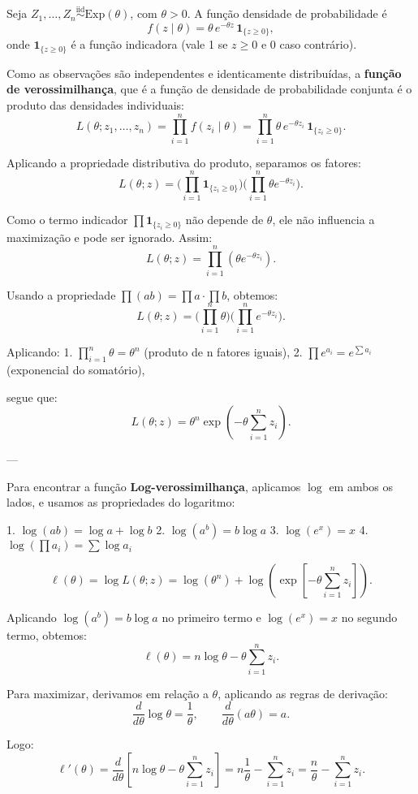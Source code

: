 Seja $Z_1,\ldots,Z_n \stackrel{\text{iid}}{\sim}\mathrm{Exp}(\theta)$, com $\theta>0$.
A função densidade de probabilidade é
\[
f(z\mid\theta)=\theta\,e^{-\theta z}\,\mathbf 1_{\{z\ge 0\}},
\]
onde $\mathbf 1_{\{z\ge 0\}}$ é a função indicadora (vale 1 se $z\ge 0$ e 0 caso contrário).

Como as observações são independentes e identicamente distribuídas,
a \textbf{função de verossimilhança}, que é a função de densidade de probabilidade conjunta é o produto das densidades individuais:
\[
L(\theta;z_1,\ldots,z_n)
=\prod_{i=1}^n f(z_i\mid\theta)
=\prod_{i=1}^n \theta\,e^{-\theta z_i}\,\mathbf 1_{\{z_i\ge 0\}}.
\]

Aplicando a propriedade distributiva do produto, separamos os fatores:
\[
L(\theta;z)
=\Big(\prod_{i=1}^n \mathbf 1_{\{z_i\ge 0\}}\Big)
\Big(\prod_{i=1}^n \theta e^{-\theta z_i}\Big).
\]

Como o termo indicador $\prod \mathbf 1_{\{z_i\ge 0\}}$ não depende de $\theta$,
ele não influencia a maximização e pode ser ignorado. Assim:
\[
L(\theta;z)
=\prod_{i=1}^n (\theta e^{-\theta z_i}).
\]

Usando a propriedade $\prod(ab)=\prod a \cdot \prod b$, obtemos:
\[
L(\theta;z)
=\Big(\prod_{i=1}^n \theta\Big)
\Big(\prod_{i=1}^n e^{-\theta z_i}\Big).
\]

Aplicando:
1. $\prod_{i=1}^n \theta = \theta^n$ (produto de n fatores iguais),  
2. $\prod e^{a_i} = e^{\sum a_i}$ (exponencial do somatório),  

segue que:
\[
L(\theta;z)
=\theta^n \exp\!\left(-\theta \sum_{i=1}^n z_i\right).
\]

---

Para encontrar a função \textbf{Log-verossimilhança}, aplicamos $\log$ em ambos os lados, e usamos as propriedades do logaritmo:

1. $\log(ab)=\log a+\log b$  
2. $\log(a^b)=b\log a$  
3. $\log(e^x)=x$  
4. $\log(\prod a_i)=\sum \log a_i$

\[
\ell(\theta)=\log L(\theta;z)
=\log(\theta^n)+\log\!\left(\exp\!\left[-\theta\sum_{i=1}^n z_i\right]\right).
\]

Aplicando $\log(a^b)=b\log a$ no primeiro termo
e $\log(e^x)=x$ no segundo termo, obtemos:
\[
\ell(\theta)=n\log\theta-\theta\sum_{i=1}^n z_i.
\]

Para maximizar, derivamos em relação a $\theta$, aplicando as regras de derivação:
\[
\frac{d}{d\theta}\log\theta=\frac{1}{\theta}, \qquad
\frac{d}{d\theta}(a\theta)=a.
\]

Logo:
\[
\ell'(\theta)
=\frac{d}{d\theta}[n\log\theta-\theta\sum_{i=1}^n z_i]
=n\frac{1}{\theta}-\sum_{i=1}^n z_i
=\frac{n}{\theta}-\sum_{i=1}^n z_i.
\]

